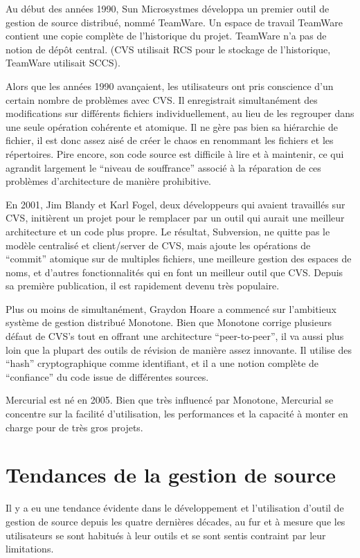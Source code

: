 Au début des années 1990, Sun Microsystmes développa un premier outil de
gestion de source distribué, nommé TeamWare. Un espace de travail TeamWare
contient une copie complète de l'historique du projet. TeamWare n'a pas de
notion de dépôt central. (CVS utilisait RCS pour le stockage de l'historique,
TeamWare utilisait SCCS).

Alors que les années 1990 avançaient, les utilisateurs ont pris conscience d'un
certain nombre de problèmes avec CVS. Il enregistrait simultanément des
modifications sur différents fichiers individuellement, au lieu de les
regrouper dans une seule opération cohérente et atomique. Il ne gère pas bien
sa hiérarchie de fichier, il est donc assez aisé de créer le chaos en renommant
les fichiers et les répertoires. Pire encore, son code source est difficile à
lire et à maintenir, ce qui agrandit largement le ``niveau de souffrance''
associé à la réparation de ces problèmes d'architecture de manière prohibitive. 

En 2001, Jim Blandy et Karl Fogel, deux développeurs qui avaient travaillés sur
CVS, initièrent un projet pour le remplacer par un outil qui aurait une
meilleur architecture et un code plus propre. Le résultat, Subversion, ne
quitte pas le modèle centralisé et client/server de CVS, mais ajoute les
opérations de ``commit'' atomique sur de multiples fichiers, une meilleure
gestion des espaces de noms, et d'autres fonctionnalités qui en font un
meilleur outil que CVS. Depuis sa première publication, il est rapidement
devenu très populaire.

Plus ou moins de simultanément, Graydon Hoare a commencé sur l'ambitieux
système de gestion distribué Monotone. Bien que Monotone corrige plusieurs
défaut de CVS's tout en offrant une architecture ``peer-to-peer'', il va aussi
plus loin que la plupart des outils de révision de manière assez innovante. Il
utilise des ``hash'' cryptographique comme identifiant, et il a une notion
complète de ``confiance'' du code issue de différentes sources.

Mercurial est né en 2005. Bien que très influencé par Monotone, Mercurial se
concentre sur la facilité d'utilisation, les performances et la capacité à
monter en charge pour de très gros projets.

\section{Tendances de la gestion de source}

Il y a eu une tendance évidente dans le développement et l'utilisation d'outil
de gestion de source depuis les quatre dernières décades, au fur et à mesure
que les utilisateurs se sont habitués à leur outils et se sont sentis contraint
par leur limitations.

